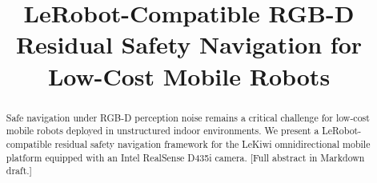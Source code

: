 \documentclass[letterpaper, 10pt, twocolumn]{IEEEtran}
\begin{document}
\title{LeRobot-Compatible RGB-D Residual Safety Navigation for Low-Cost Mobile Robots}

\author{
}

\maketitle

\begin{abstract}
Safe navigation under RGB-D perception noise remains a critical challenge for low-cost mobile robots deployed in unstructured indoor environments. We present a LeRobot-compatible residual safety navigation framework for the LeKiwi omnidirectional mobile platform equipped with an Intel RealSense D435i camera. [Full abstract in Markdown draft.]
\end{abstract}





\end{document}
